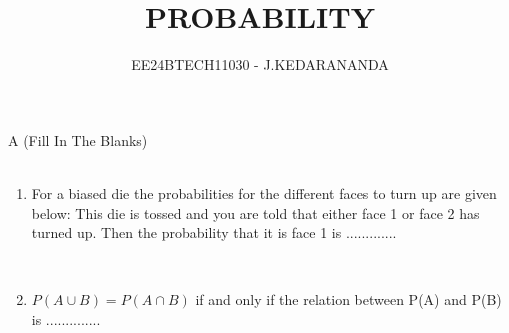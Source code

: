 \documentclass[journal,12pt,twocolumn]{IEEEtran}
\theoremstyle{remark}
\begin{document}

\vspace{3cm}

\title{PROBABILITY}
\author{EE24BTECH11030 - J.KEDARANANDA}
\maketitle
\newpage
\bigskip

\renewcommand{\thefigure}{\theenumi}
\renewcommand{\thetable}{\theenumi}
A  (Fill In The Blanks)\\\\
\begin{enumerate}
    \item For a biased die the probabilities for the different faces to turn up are given below:
    \bigskip
    This die is tossed and you are told that either face 1 or face 2 has turned up. Then the probability that it is face 1 is .............
    
    \hfill{}\\
    
    \item $P(A \cup B)=P(A \cap B)$ if and only if the relation between P(A) and P(B) is .............. 
    

\end{enumerate}
\end{document}
